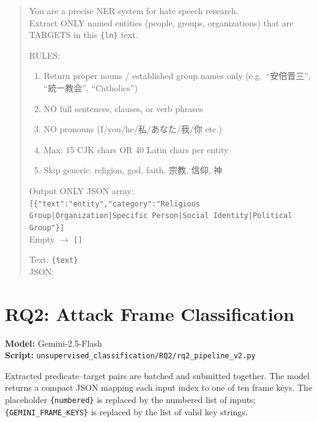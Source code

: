 \documentclass[../CLthesis.tex]{subfiles}
\begin{document}
\begin{quote}
\small\noindent
You are a precise NER system for hate speech research.\\
Extract ONLY named entities (people, groups, organizations) that are TARGETS in this \texttt{\{ln\}} text.

RULES:
\begin{enumerate}\setlength{\itemsep}{0pt}
  \item Return proper nouns / established group names only (e.g.\ ``安倍晋三'', ``統一教会'', ``Catholics'')
  \item NO full sentences, clauses, or verb phrases
  \item NO pronouns (I/you/he/私/あなた/我/你 etc.)
  \item Max: 15 CJK chars OR 40 Latin chars per entity
  \item Skip generic: religion, god, faith, 宗教, 信仰, 神
\end{enumerate}

Output ONLY JSON array:\\
\texttt{[\{"text":"entity","category":"Religious Group|Organization|Specific Person|Social Identity|Political Group"\}]}\\
Empty $\rightarrow$ \texttt{[]}

Text: \texttt{\{text\}}\\
JSON:
\end{quote}

\section{RQ2: Attack Frame Classification}
\label{sec:prompt-rq2}

\noindent\textbf{Model:} Gemini-2.5-Flash \\
\textbf{Script:} \texttt{unsupervised\_classification/RQ2/rq2\_pipeline\_v2.py}

\smallskip\noindent
Extracted predicate--target pairs are batched and submitted together. The model returns a compact JSON mapping each input index to one of ten frame keys. The placeholder \texttt{\{numbered\}} is replaced by the numbered list of inputs; \texttt{\{GEMINI\_FRAME\_K\allowbreak EYS\}} is replaced by the list of valid key strings.
\end{document}
